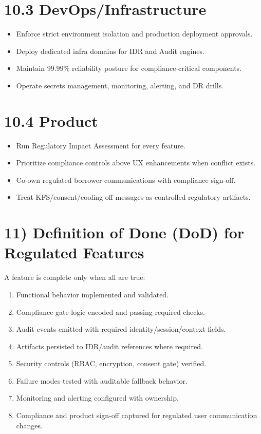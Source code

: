 ﻿\documentclass[12pt]{article}
\begin{document}
\section{10.3 DevOps/Infrastructure}


\begin{itemize}
\item Enforce strict environment isolation and production deployment approvals.
\item Deploy dedicated infra domains for IDR and Audit engines.
\item Maintain 99.99\% reliability posture for compliance-critical components.
\item Operate secrets management, monitoring, alerting, and DR drills.
\end{itemize}

\section{10.4 Product}


\begin{itemize}
\item Run Regulatory Impact Assessment for every feature.
\item Prioritize compliance controls above UX enhancements when conflict exists.
\item Co-own regulated borrower communications with compliance sign-off.
\item Treat KFS/consent/cooling-off messages as controlled regulatory artifacts.
\end{itemize}

\section{11) Definition of Done (DoD) for Regulated Features}


A feature is complete only when all are true:


\begin{enumerate}
\item Functional behavior implemented and validated.
\item Compliance gate logic encoded and passing required checks.
\item Audit events emitted with required identity/session/context fields.
\item Artifacts persisted to IDR/audit references where required.
\item Security controls (RBAC, encryption, consent gate) verified.
\item Failure modes tested with auditable fallback behavior.
\item Monitoring and alerting configured with ownership.
\item Compliance and product sign-off captured for regulated user communication changes.
\end{enumerate}
\end{document}
